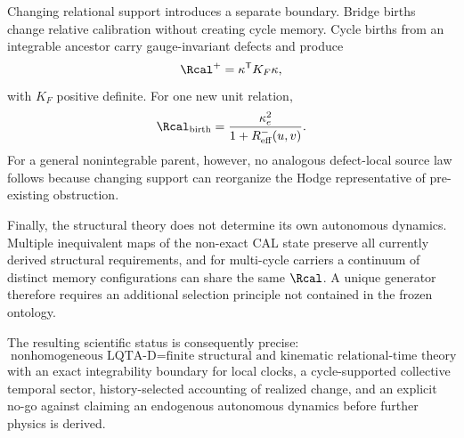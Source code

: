 Changing relational support introduces a separate boundary. Bridge births change relative calibration without creating cycle memory. Cycle births from an integrable ancestor carry gauge-invariant defects and produce
\begin{equation}
\Rcal^+=\kappa^{\mathsf T}K_F\kappa,
\end{equation}
with $K_F$ positive definite. For one new unit relation,
\begin{equation}
\Rcal_{\rm birth}
=
\frac{\kappa_e^2}{1+R_{\rm eff}^-(u,v)}.
\end{equation}
For a general nonintegrable parent, however, no analogous defect-local source law follows because changing support can reorganize the Hodge representative of pre-existing obstruction.

Finally, the structural theory does not determine its own autonomous dynamics. Multiple inequivalent maps of the non-exact CAL state preserve all currently derived structural requirements, and for multi-cycle carriers a continuum of distinct memory configurations can share the same $\Rcal$. A unique generator therefore requires an additional selection principle not contained in the frozen ontology.

The resulting scientific status is consequently precise:
\begin{equation}
\boxed{
\text{nonhomogeneous LQTA-D}
=
\text{finite structural and kinematic relational-time theory}
}
\end{equation}
with an exact integrability boundary for local clocks, a cycle-supported collective temporal sector, history-selected accounting of realized change, and an explicit no-go against claiming an endogenous autonomous dynamics before further physics is derived.